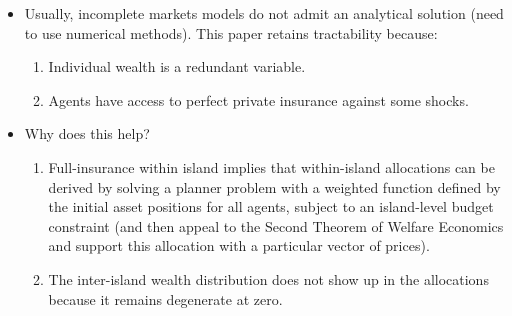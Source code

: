 \documentclass[notes=show]{beamer}
\begin{document}
\begin{frame}%



\begin{itemize}
\item Usually, incomplete markets models do not admit an analytical solution
(need to use numerical methods). This paper retains tractability because:

\begin{enumerate}
\item Individual wealth is a redundant variable.

\item Agents have access to perfect private insurance against some shocks.
\end{enumerate}

\item Why does this help?

\begin{enumerate}
\item Full-insurance within island implies that within-island allocations
can be derived by solving a planner problem with a weighted function defined
by the initial asset positions for all agents, subject to an island-level
budget constraint (and then appeal to the Second Theorem of Welfare
Economics and support this allocation with a particular vector of prices).

\item The inter-island wealth distribution does not show up in the
allocations because it remains degenerate at zero.
\end{enumerate}
\end{itemize}

\transboxout%
\end{frame}%

\bigskip
\end{document}
